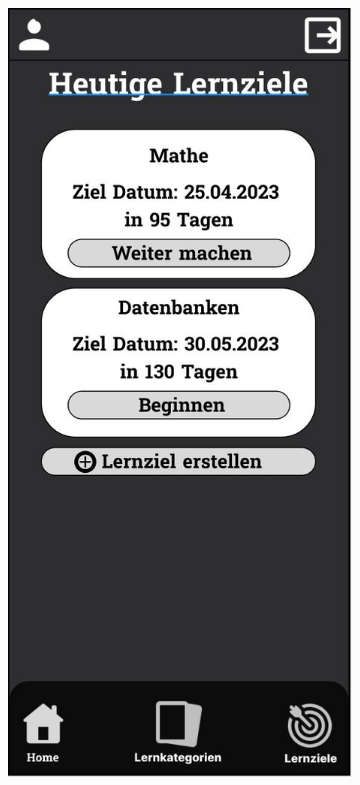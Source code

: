     \newpage

    \begin{figure}[htbp]
        \centering
        \begin{subfigure}[b]{0.45\linewidth}
          \centering
          \includegraphics[width=\linewidth]{images/Mockups/Home.JPG}

\end{subfigure}
\end{figure}
